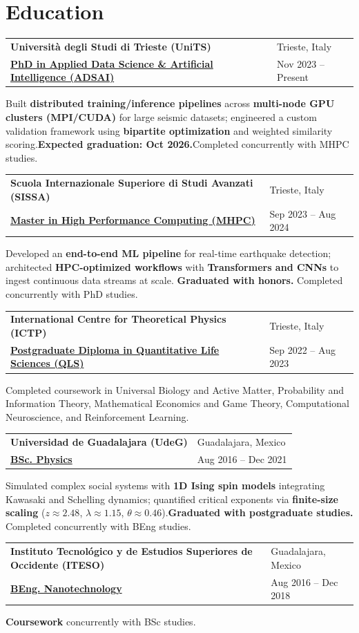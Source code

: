 \documentclass[10pt,a4paper]{article}
\makeatletter
\newcommand{\cventry}[4]{%
  \vspace{2pt}%
  \begin{tabularx}{\textwidth}{@{}X>{\raggedleft\arraybackslash}p{1.55in}@{}}
    {\bfseries\color{ink}#1} & {\small\color{muted}#3}\\[-1pt]
    {\bfseries\color{accent}#2} & {\small\color{muted}#4}
  \end{tabularx}%
  \vspace{-1pt}%
}
\makeatother
\begin{document}
\newpage
\section*{Education}

\cventry{Università degli Studi di Trieste (UniTS)}
{\href{https://adsai.inginf.units.it/}{PhD in Applied Data Science \&
Artificial Intelligence (ADSAI)}}{Trieste, Italy}{Nov 2023 -- Present}
Built \textbf{distributed training/inference pipelines} across
\textbf{multi-node GPU clusters (MPI/CUDA)} for large seismic
datasets; engineered a custom validation framework using
\textbf{bipartite optimization} and weighted similarity
scoring.\newline\textbf{Expected graduation: Oct
2026.}\hspace*{\fill}Completed concurrently with MHPC studies.

\cventry{Scuola Internazionale Superiore di Studi Avanzati (SISSA)}
{\href{https://www.mhpc.it}{Master in High Performance Computing (MHPC)}}
{Trieste, Italy}{Sep 2023 -- Aug 2024}
Developed an \textbf{end-to-end ML pipeline} for real-time earthquake
detection; architected \textbf{HPC-optimized workflows} with
\textbf{Transformers and CNNs} to ingest continuous data streams at scale.
\newline\textbf{Graduated with honors.}
\hspace*{\fill}Completed concurrently with PhD studies.

\cventry{International Centre for Theoretical Physics
(ICTP)}{\href{https://www.ictp.it/opportunity/ictp-postgraduate-diploma-programme}{Postgraduate
Diploma in Quantitative Life Sciences (QLS)}}{Trieste, Italy}{Sep
2022 -- Aug 2023}
Completed coursework in Universal Biology and Active Matter, Probability and
Information Theory, Mathematical Economics and Game Theory, Computational
Neuroscience, and Reinforcement Learning.

\cventry{Universidad de Guadalajara (UdeG)}
{\href{https://www.cucei.udg.mx/carreras/fisica/}{BSc. Physics}}
{Guadalajara, Mexico}{Aug 2016 -- Dec 2021}
Simulated complex social systems with \textbf{1D Ising spin models} integrating
Kawasaki and Schelling dynamics; quantified critical exponents via
\textbf{finite-size scaling} ($z \approx 2.48$, $\lambda \approx 1.15$,
$\theta \approx 0.46$).\newline\textbf{Graduated with postgraduate studies.}
\hspace*{\fill}Completed concurrently with BEng studies.

\cventry{Instituto Tecnológico y de Estudios Superiores de Occidente (ITESO)}
{\href{https://www.iteso.mx/}{BEng. Nanotechnology}}
{Guadalajara, Mexico}{Aug 2016 -- Dec 2018}
\hspace*{\fill}\textbf{Coursework} concurrently with BSc studies.
\end{document}
